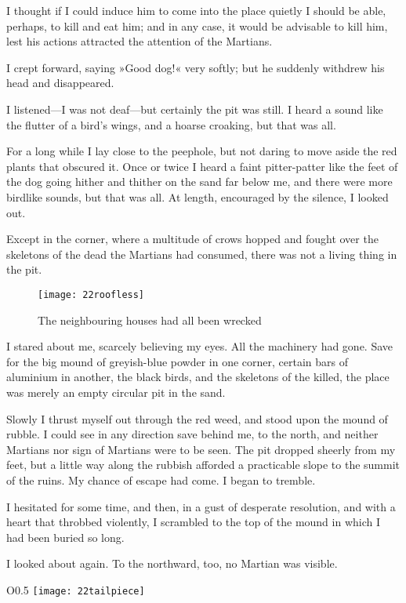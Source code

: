 I thought if I could induce him to come into the place quietly I should be able, perhaps, to kill and eat him; and in any case, it would be advisable to kill him, lest his actions attracted the attention of the Martians.

I crept forward, saying »Good dog!« very softly; but he suddenly withdrew his head and disappeared.

I listened—I was not deaf—but certainly the pit was still. I heard a sound like the flutter of a bird's wings, and a hoarse croaking, but that was all.

For a long while I lay close to the peephole, but not daring to move aside the red plants that obscured it. Once or twice I heard a faint pitter-patter like the feet of the dog going hither and thither on the sand far below me, and there were more birdlike sounds, but that was all. At length, encouraged by the silence, I looked out.

Except in the corner, where a multitude of crows hopped and fought over the skeletons of the dead the Martians had consumed, there was not a living thing in the pit.

\begin{figure}[tbp]
\centering
\texttt{[image: 22roofless]}
\caption{The neighbouring houses had all been wrecked}
\end{figure}

I stared about me, scarcely believing my eyes. All the machinery had gone. Save for the big mound of greyish-blue powder in one corner, certain bars of aluminium in another, the black birds, and the skeletons of the killed, the place was merely an empty circular pit in the sand.

Slowly I thrust myself out through the red weed, and stood upon the mound of rubble. I could see in any direction save behind me, to the north, and neither Martians nor sign of Martians were to be seen. The pit dropped sheerly from my feet, but a little way along the rubbish afforded a practicable slope to the summit of the ruins. My chance of escape had come. I began to tremble.

I hesitated for some time, and then, in a gust of desperate resolution, and with a heart that throbbed violently, I scrambled to the top of the mound in which I had been buried so long.

I looked about again. To the northward, too, no Martian was visible.

	\begin{wrapfigure}{O}{0.5\textwidth}
		\centering
		\texttt{[image: 22tailpiece]}
	\end{wrapfigure}


